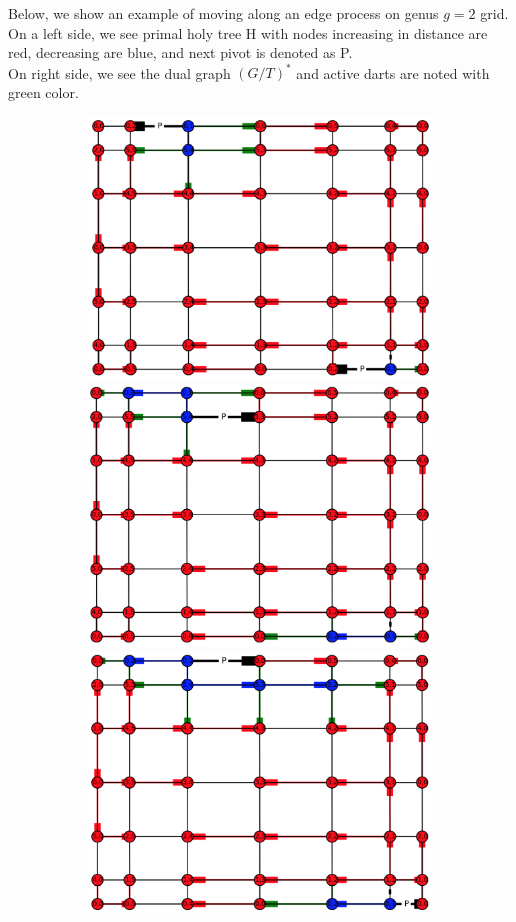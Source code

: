 \documentclass{article}
\begin{document}
Below, we show an example of moving along an edge process on genus $g=2$ grid.\\
On a left side, we see primal holy tree H with nodes increasing in distance are 
red, decreasing are blue, and next pivot is denoted as P.\\
On right side, we see the dual graph $(G/T)^*$ and active darts are noted 
with green color.

\begin{figure}
\centering
\begin{subfigure}{.5\textwidth}
  \vspace{-6.0\baselineskip}
  \includegraphics[width=0.8\linewidth,angle=-90]{figures/g2_primal_1.png}\\[9ex]
  \includegraphics[width=0.8\linewidth,angle=-90]{figures/g2_primal_2.png}\\[9ex]
  \includegraphics[width=0.8\linewidth,angle=-90]{figures/g2_primal_3.png}

\end{subfigure}
\end{figure}
\end{document}
